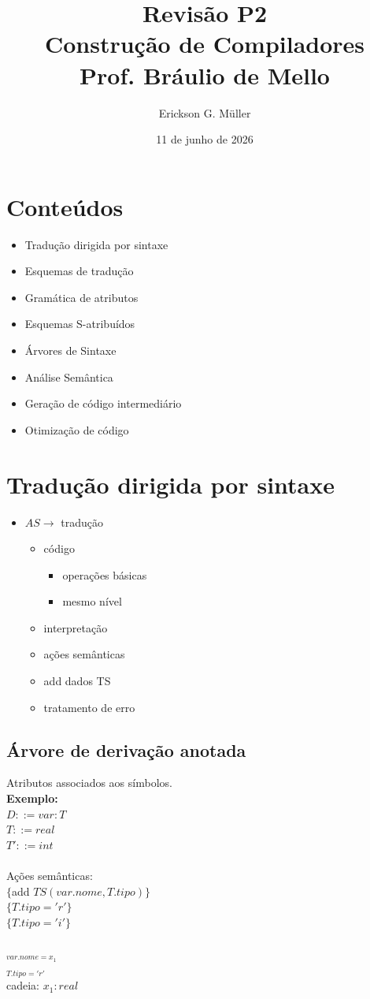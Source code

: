 \documentclass[ 12pt, a4paper]{article}
\title{Revisão P2\\Construção de Compiladores\\Prof. Bráulio de Mello}
\author{Erickson G. Müller}
\date{11 de junho de 2026}
\begin{document}
\maketitle
\section*{Conteúdos}
	\begin{itemize}
		\item Tradução dirigida por sintaxe
		\item Esquemas de tradução
		\item Gramática de atributos
		\item Esquemas S-atribuídos
		\item Árvores de Sintaxe
		\item Análise Semântica
		\item Geração de código intermediário
		\item Otimização de código
	\end{itemize}
\newpage

\section{Tradução dirigida por sintaxe}
\begin{itemize}
	\item $AS \to $ tradução
	\begin{itemize}
		\item código
			\begin{itemize}
				\item operações básicas
				\item mesmo nível
			\end{itemize}
		\item interpretação
		\item ações semânticas
		\item add dados TS
		\item tratamento de erro
	\end{itemize}
\end{itemize}
	\subsection{Árvore de derivação anotada}

	Atributos associados aos símbolos.\\
	\textbf{Exemplo:}\\
		$D::= var: T$\\
		$T::= real$\\
		$T'::= int$\\
		\\
		Ações semânticas:\\
		$\{$add $TS(var.nome, T.tipo)\}$\\
		$\{T.tipo='r'\}$\\
		$\{T.tipo='i'\}$\\
		\\
		$_{var.nome=x_1}$\\
		$_{T.tipo = 'r'}$\\
		cadeia: $x_1:real$
\end{document}
